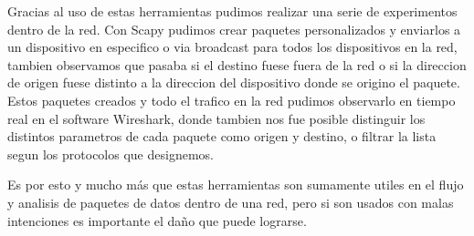 \documentclass[spanish]{udpreport}
\begin{document}
Gracias al uso de estas herramientas pudimos realizar una serie de experimentos dentro de la red. Con Scapy pudimos crear paquetes personalizados y enviarlos a un dispositivo en especifico o via broadcast para todos los dispositivos en la red, tambien observamos que pasaba si el destino fuese fuera de la red o si la direccion de origen fuese distinto a la direccion del dispositivo donde se origino el paquete. Estos paquetes creados y todo el trafico en la red pudimos observarlo en tiempo real en el software Wireshark, donde tambien nos fue posible distinguir los distintos parametros de cada paquete como origen y destino, o filtrar la lista segun los protocolos que designemos.

Es por esto y mucho más que estas herramientas son sumamente utiles en el flujo y analisis de paquetes de datos dentro de una red, pero si son usados con malas intenciones es importante el daño que puede lograrse.

\end{document}
